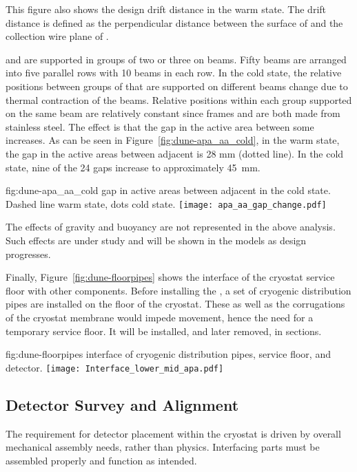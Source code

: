 This figure also shows the design drift distance in the warm
state. The drift distance is defined as the perpendicular distance
between the surface of  and the collection wire plane of
.

 and  are supported in groups of two or three
on  beams. Fifty beams are arranged into five parallel rows
with 10 beams in each row.  In the cold state, the relative positions
between groups of  that are supported on different beams
change due to thermal contraction of the beams. Relative positions
within each group supported on the same beam are relatively constant
since  frames and  are both made from stainless
steel.  The effect is that the gap in the active area between some
 increases.  As can be seen in
Figure~\ref{fig:dune-apa_aa_cold}, in the warm state, the gap in the
active areas between adjacent  is 28 mm (dotted line). In
the cold state, nine of the 24 gaps increase to approximately 45~mm.
\begin{dunefigure}{fig:dune-apa_aa_cold} 
    { gap in active areas between adjacent 
      in the cold state. Dashed line warm state, dots cold state.}
    \texttt{[image: apa\_aa\_gap\_change.pdf]}
\end{dunefigure}

The effects of gravity and buoyancy are not represented in the above
analysis. Such effects are under study and will be shown in the models
as design progresses.

Finally, Figure~\ref{fig:dune-floorpipes} shows the interface of the
cryostat service floor with other components.  Before installing the
, a set of cryogenic distribution pipes are installed
on the floor of the cryostat. These as well as the corrugations of the
cryostat membrane would impede movement, hence the need for
a temporary service floor. It will be installed, and later removed, in sections. 
\begin{dunefigure}{fig:dune-floorpipes}
{ interface of cryogenic distribution pipes, service
  floor, and detector.}
\texttt{[image: Interface\_lower\_mid\_apa.pdf]}
\end{dunefigure}

\subsection{Detector Survey and Alignment}
\label{sec:fdsp-coord-integ-survey}
The requirement for detector placement within the cryostat is driven
by overall mechanical assembly needs, rather than physics.
Interfacing parts must be assembled properly and function as intended.


